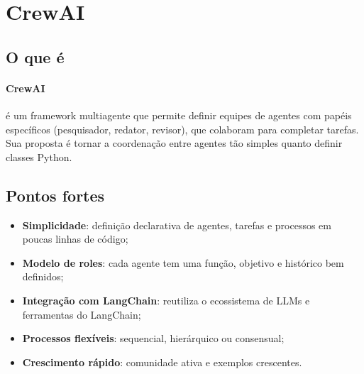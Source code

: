 \section{CrewAI}
\label{sec:crewai}
\nivelbasico
\subsection{O que é}
\paragraph{CrewAI} é um framework multiagente que permite definir equipes
de agentes com papéis específicos (pesquisador, redator, revisor), que
colaboram para completar tarefas. Sua proposta é tornar a coordenação entre
agentes tão simples quanto definir classes Python.
\subsection{Pontos fortes}
\begin{itemize}
\item \textbf{Simplicidade}: definição declarativa de agentes, tarefas
e processos em poucas linhas de código;
\item \textbf{Modelo de roles}: cada agente tem uma função, objetivo e
histórico bem definidos;
\item \textbf{Integração com LangChain}: reutiliza o ecossistema de
LLMs e ferramentas do LangChain;
\item \textbf{Processos flexíveis}: sequencial, hierárquico ou
consensual;
\item \textbf{Crescimento rápido}: comunidade ativa e exemplos
crescentes.
\end{itemize}
